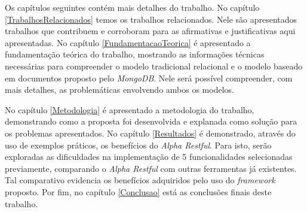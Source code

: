 
Os capítulos seguintes contém mais detalhes do trabalho. No capítulo \ref{TrabalhosRelacionados} temos os trabalhos relacionados. Nele são apresentados trabalhos que contribuem e corroboram para as afirmativas e justificativas aqui apresentadas. No capítulo \ref{FundamentacaoTeorica} é apresentado a fundamentação teórica do trabalho, mostrando as informações técnicas necessárias para compreender o modelo tradicional relacional e o modelo baseado em documentos proposto pelo \textit{MongoDB}. Nele será possível compreender, com mais detalhes, as problemáticas envolvendo ambos os modelos.

No capítulo \ref{Metodologia} é apresentado a metodologia do trabalho, demonstrando como a proposta foi desenvolvida e explanada como solução para os problemas apresentados. No capítulo \ref{Resultados} é demonstrado, através do uso de exemplos práticos, os benefícios do \textit{Alpha Restful}. Para isto, serão exploradas as dificuldades na implementação de 5 funcionalidades selecionadas previamente, comparando o \textit{Alpha Restful} com outras ferramentas já existentes. Tal comparativo evidencia os benefícios adquiridos pelo uso do \textit{framework} proposto. Por fim, no capítulo \ref{Conclusao} está as conclusões finais deste trabalho.




